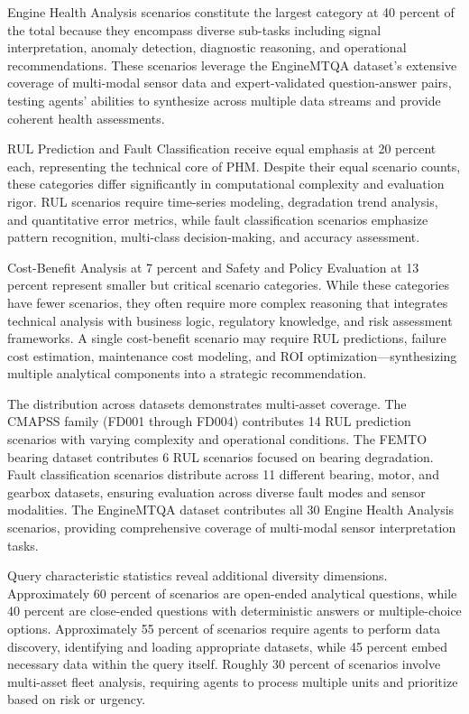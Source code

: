 \documentclass[conference]{IEEEtran}
\begin{document}
Engine Health Analysis scenarios constitute the largest category at 40 percent of the total because they encompass diverse sub-tasks including signal interpretation, anomaly detection, diagnostic reasoning, and operational recommendations. These scenarios leverage the EngineMTQA dataset's extensive coverage of multi-modal sensor data and expert-validated question-answer pairs, testing agents' abilities to synthesize across multiple data streams and provide coherent health assessments.

RUL Prediction and Fault Classification receive equal emphasis at 20 percent each, representing the technical core of PHM. Despite their equal scenario counts, these categories differ significantly in computational complexity and evaluation rigor. RUL scenarios require time-series modeling, degradation trend analysis, and quantitative error metrics, while fault classification scenarios emphasize pattern recognition, multi-class decision-making, and accuracy assessment.

Cost-Benefit Analysis at 7 percent and Safety and Policy Evaluation at 13 percent represent smaller but critical scenario categories. While these categories have fewer scenarios, they often require more complex reasoning that integrates technical analysis with business logic, regulatory knowledge, and risk assessment frameworks. A single cost-benefit scenario may require RUL predictions, failure cost estimation, maintenance cost modeling, and ROI optimization—synthesizing multiple analytical components into a strategic recommendation.

The distribution across datasets demonstrates multi-asset coverage. The CMAPSS family (FD001 through FD004) contributes 14 RUL prediction scenarios with varying complexity and operational conditions. The FEMTO bearing dataset contributes 6 RUL scenarios focused on bearing degradation. Fault classification scenarios distribute across 11 different bearing, motor, and gearbox datasets, ensuring evaluation across diverse fault modes and sensor modalities. The EngineMTQA dataset contributes all 30 Engine Health Analysis scenarios, providing comprehensive coverage of multi-modal sensor interpretation tasks.

Query characteristic statistics reveal additional diversity dimensions. Approximately 60 percent of scenarios are open-ended analytical questions, while 40 percent are close-ended questions with deterministic answers or multiple-choice options. Approximately 55 percent of scenarios require agents to perform data discovery, identifying and loading appropriate datasets, while 45 percent embed necessary data within the query itself. Roughly 30 percent of scenarios involve multi-asset fleet analysis, requiring agents to process multiple units and prioritize based on risk or urgency.
\end{document}
